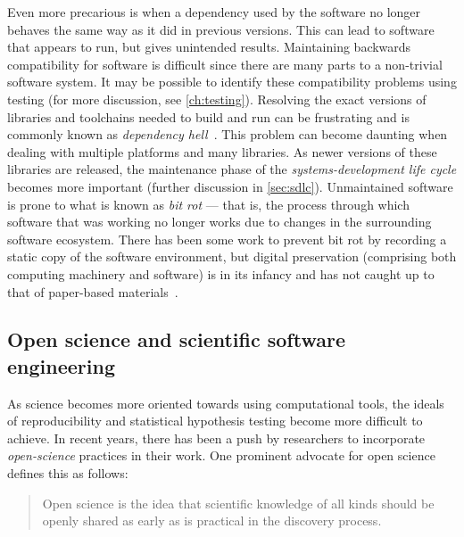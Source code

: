 { %
	Even more precarious is when a dependency used by the
	software no longer behaves the same way as it did in
	previous versions. This can lead to software that appears
	to run, but gives unintended results. Maintaining
	backwards compatibility for software is difficult since
	there are many parts to a non-trivial software system.
	It may be possible to identify these compatibility problems using
	testing (for more discussion, see \cref{ch:testing}).
	Resolving the exact versions of libraries and toolchains
	needed to build and run can be frustrating and is commonly
	known as \emph{dependency hell}~\autocite{anderson2000end,ModellingSoftDep:Burrows,Guo2011}.
	This problem can become
	daunting when dealing with multiple platforms and many
	libraries. As newer versions of these libraries are
	released, the maintenance phase of the \emph{systems-development life cycle}
	becomes more important (further discussion in \cref{sec:sdlc}).
	Unmaintained software is prone to what is known as
	\emph{bit rot} --- that is, the process through which
	software that was working no longer works due to changes
	in the surrounding software ecosystem.
	There has been some work to prevent bit rot by recording a
	static copy of the software environment, but digital
	preservation (comprising both computing machinery and
	software) is in its infancy and has not caught up to that
	of paper-based materials~\autocite{PreservingExe2013,Thain2015,Meng2015}.
}


\subsection{Open science and scientific software engineering}\label{subsec:open-science}

As science becomes more oriented towards using computational
tools, the ideals of reproducibility and statistical hypothesis
testing become more difficult to achieve. In recent years, there
has been a push by researchers to incorporate \emph{open-science}
practices in their work. One prominent advocate for open science
defines this as follows:\vspace{-3.5\parskip}
\begin{quote}
	\begin{fancyquote}
	Open science is the idea that scientific knowledge of all kinds
	should be openly shared as early as is practical in the discovery
	process.
	\end{fancyquote}
\end{quote}

